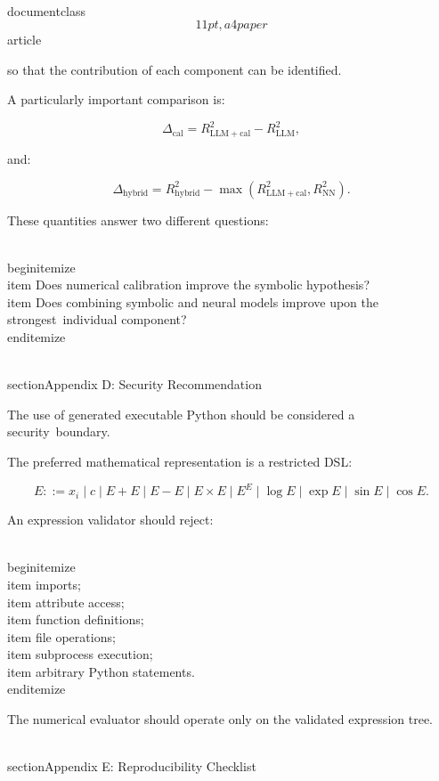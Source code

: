 \\documentclass\[11pt,a4paper\]{article}
\begin{document}
 so that the contribution of each component can be identified.

 A particularly important comparison is:

 $$
\Delta_{\mathrm{cal}}
=
R^2_{\mathrm{LLM+cal}}
-
R^2_{\mathrm{LLM}},
$$

 and:

 $$
\Delta_{\mathrm{hybrid}}
=
R^2_{\mathrm{hybrid}}
-
\max
\left(
R^2_{\mathrm{LLM+cal}},
R^2_{\mathrm{NN}}
\right).
$$

 These quantities answer two different questions:

 \\begin{itemize}\
 \\item Does numerical calibration improve the symbolic hypothesis?\
 \\item Does combining symbolic and neural models improve upon the strongest\
 individual component?\
 \\end{itemize}

 \\section{Appendix D: Security Recommendation}\

 The use of generated executable Python should be considered a security\
 boundary.

 The preferred mathematical representation is a restricted DSL:

 $$
E::=
x_i
\mid
c
\mid
E+E
\mid
E-E
\mid
E\times E
\mid
E^E
\mid
\log E
\mid
\exp E
\mid
\sin E
\mid
\cos E.
$$

 An expression validator should reject:

 \\begin{itemize}\
 \\item imports;\
 \\item attribute access;\
 \\item function definitions;\
 \\item file operations;\
 \\item subprocess execution;\
 \\item arbitrary Python statements.\
 \\end{itemize}

 The numerical evaluator should operate only on the validated expression tree.

 \\section{Appendix E: Reproducibility Checklist}\
\end{document}
